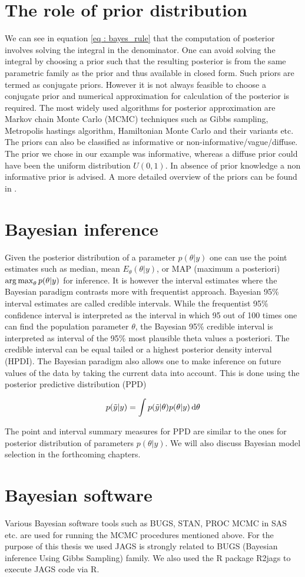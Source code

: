 \section{The role of prior distribution}
We can see in equation \ref{eq : bayes_rule} that the computation of posterior involves solving the integral in the denominator. One can avoid solving the integral by choosing a prior such that the resulting posterior is from the same parametric family as the prior and thus available in closed form. Such priors are termed as conjugate priors. However it is not always feasible to choose a conjugate prior and numerical approximation for calculation of the posterior is required. The most widely used algorithms for posterior approximation are Markov chain Monte Carlo (MCMC) techniques such as Gibbs sampling, Metropolis hastings algorithm, Hamiltonian Monte Carlo and their variants etc. The priors can also be classified as informative or non-informative/vague/diffuse. The prior we chose in our example was informative, whereas a diffuse prior could have been the uniform distribution $U(0,1)$. In absence of prior knowledge a non informative prior is advised. A more detailed overview of the priors can be found in \citet{lesaffre_bayesian_2012}.

\section{Bayesian inference}
Given the posterior distribution of a parameter $p(\theta|y)$ one can use the point estimates such as median, mean $E_\theta(\theta|y)$, or MAP (maximum a posteriori) $\operatorname*{arg\,max}_\theta p(\theta|y)$ for inference. It is however the interval estimates where the Bayesian paradigm contrasts more with frequentist approach. Bayesian 95\% interval estimates are called credible intervals. While the frequentist 95\% confidence interval is interpreted as the interval in which 95 out of 100 times one can find the population parameter $\theta$, the Bayesian 95\% credible interval is interpreted as interval of the 95\% most plausible theta values a posteriori. The credible interval can be equal tailed or a highest posterior density interval (HPDI). The Bayesian paradigm also allows one to make inference on future values of the data by taking the current data into account. This is done using the posterior predictive distribution (PPD)

$$p(\tilde{y}|y) = \int p(\tilde{y}|\theta) p(\theta|y) \mathop{}\!\mathrm{d}\theta$$

The point and interval summary measures for PPD are similar to the ones for posterior distribution of parameters $p(\theta|y)$. We will also discuss Bayesian model selection in the forthcoming chapters.

\section{Bayesian software}
Various Bayesian software tools such as BUGS, STAN, PROC MCMC in SAS etc. are used for running the MCMC procedures mentioned above. For the purpose of this thesis we used JAGS is strongly related to BUGS (Bayesian inference Using Gibbs Sampling) family. We also used the R package R2jags to execute JAGS code via R.